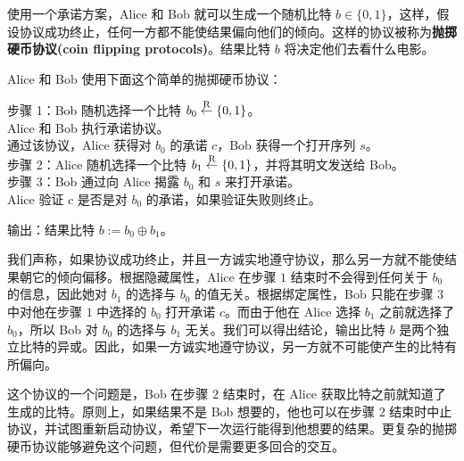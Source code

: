 \begin{snote}[抛掷硬币。]
使用一个承诺方案，Alice 和 Bob 就可以生成一个随机比特 $b\in\{0,1\}$，这样，假设协议成功终止，任何一方都不能使结果偏向他们的倾向。这样的协议被称为\textbf{抛掷硬币协议(coin flipping protocols)}。结果比特 $b$ 将决定他们去看什么电影。

Alice 和 Bob 使用下面这个简单的抛掷硬币协议：

\vspace*{5pt}

\hspace*{5pt} 步骤 1：Bob 随机选择一个比特 $b_0\overset{\rm R}\leftarrow\{0,1\}$。\\
\hspace*{50pt} Alice 和 Bob 执行承诺协议。\\
\hspace*{50pt} 通过该协议，Alice 获得对 $b_0$ 的承诺 $c$，Bob 获得一个打开序列 $s$。\\
\hspace*{26pt} 步骤 2：Alice 随机选择一个比特 $b_1\overset{\rm R}\leftarrow\{0,1\}$，并将其明文发送给 Bob。\\
\hspace*{26pt} 步骤 3：Bob 通过向 Alice 揭露 $b_0$ 和 $s$ 来打开承诺。\\
\hspace*{50pt} Alice 验证 $c$ 是否是对 $b_0$ 的承诺，如果验证失败则终止。

\vspace*{3pt}

\hspace*{5pt} 输出：结果比特 $b:=b_0\oplus b_1$。

\vspace*{5pt}

\noindent
我们声称，如果协议成功终止，并且一方诚实地遵守协议，那么另一方就不能使结果朝它的倾向偏移。根据隐藏属性，Alice 在步骤 $1$ 结束时不会得到任何关于 $b_0$ 的信息，因此她对 $b_1$ 的选择与 $b_0$ 的值无关。根据绑定属性，Bob 只能在步骤 $3$ 中对他在步骤 $1$ 中选择的 $b_0$ 打开承诺 $c$。而由于他在 Alice 选择 $b_1$ 之前就选择了 $b_0$，所以 Bob 对 $b_0$ 的选择与 $b_1$ 无关。我们可以得出结论，输出比特 $b$ 是两个独立比特的异或。因此，如果一方诚实地遵守协议，另一方就不可能使产生的比特有所偏向。

这个协议的一个问题是，Bob 在步骤 $2$ 结束时，在 Alice 获取比特之前就知道了生成的比特。原则上，如果结果不是 Bob 想要的，他也可以在步骤 $2$ 结束时中止协议，并试图重新启动协议，希望下一次运行能得到他想要的结果。更复杂的抛掷硬币协议能够避免这个问题，但代价是需要更多回合的交互。
\end{snote}

